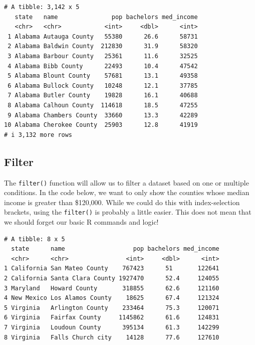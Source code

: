 \documentclass[
  letterpaper,
  DIV=11,
  numbers=noendperiod]{scrreprt}
\newenvironment{Shaded}{\begin{snugshade}}{\end{snugshade}}
\newcommand{\DecValTok}[1]{\textcolor[rgb]{0.68,0.00,0.00}{#1}}
\newcommand{\NormalTok}[1]{\textcolor[rgb]{0.00,0.23,0.31}{#1}}
\newcommand{\SpecialCharTok}[1]{\textcolor[rgb]{0.37,0.37,0.37}{#1}}
\begin{document}
\begin{verbatim}
# A tibble: 3,142 x 5
   state   name               pop bachelors med_income
   <chr>   <chr>            <int>     <dbl>      <int>
 1 Alabama Autauga County   55380      26.6      58731
 2 Alabama Baldwin County  212830      31.9      58320
 3 Alabama Barbour County   25361      11.6      32525
 4 Alabama Bibb County      22493      10.4      47542
 5 Alabama Blount County    57681      13.1      49358
 6 Alabama Bullock County   10248      12.1      37785
 7 Alabama Butler County    19828      16.1      40688
 8 Alabama Calhoun County  114618      18.5      47255
 9 Alabama Chambers County  33660      13.3      42289
10 Alabama Cherokee County  25903      12.8      41919
# i 3,132 more rows
\end{verbatim}

\subsection{Filter}\label{filter}

The \texttt{filter()} function will allow us to filter a dataset based
on one or multiple conditions. In the code below, we want to only show
the counties whose median income is greater than \$120,000. While we
could do this with index-selection brackets, using the \texttt{filter()}
is probably a little easier. This does not mean that we should forget
our basic R commands and logic!

\begin{Shaded}
\end{Shaded}

\begin{verbatim}
# A tibble: 8 x 5
  state      name                   pop bachelors med_income
  <chr>      <chr>                <int>     <dbl>      <int>
1 California San Mateo County    767423      51       122641
2 California Santa Clara County 1927470      52.4     124055
3 Maryland   Howard County       318855      62.6     121160
4 New Mexico Los Alamos County    18625      67.4     121324
5 Virginia   Arlington County    233464      75.3     120071
6 Virginia   Fairfax County     1145862      61.6     124831
7 Virginia   Loudoun County      395134      61.3     142299
8 Virginia   Falls Church city    14128      77.6     127610
\end{verbatim}
\end{document}
